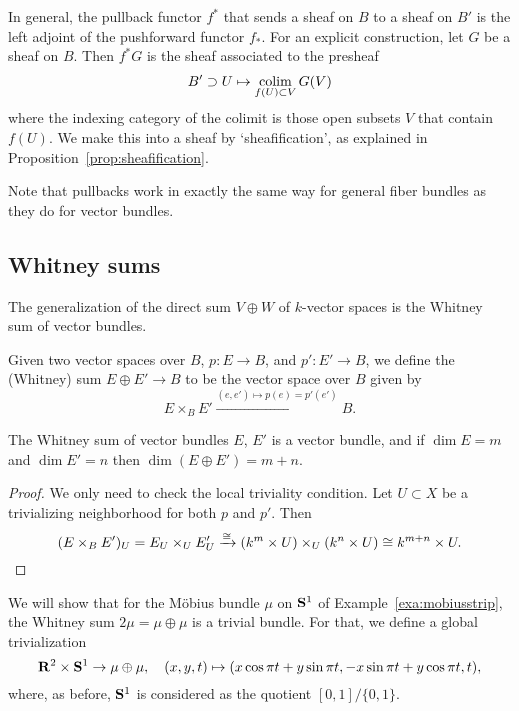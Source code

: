 \documentclass[a4paper,openany]{scrbook}
\begin{document}
In general, the pullback functor $f^*$ that sends a sheaf on $B$ to a sheaf on $B'$ is the left adjoint of the pushforward functor $f_*$. For an explicit construction, let $G$ be a sheaf on $B$. Then $f^*G$ is the sheaf associated to the presheaf
\begin{align*}
B' \supset U \mapsto \colim_{f(U) \subset V} G(V)
\end{align*}
where the indexing category of the colimit is those open subsets $V$ that contain $f(U)$. We make this into a sheaf by `sheafification', as explained in Proposition~\ref{prop:sheafification}.

Note that pullbacks work in exactly the same way for general fiber bundles as they do for vector bundles.

\subsection{Whitney sums} \label{ssec:whitneysums}

The generalization of the direct sum $V \oplus W$ of $k$-vector spaces is the Whitney sum of vector bundles.

\begin{defn}
Given two vector spaces over $B$, $p\colon E \to B$, and $p'\colon E' \to B$, we define the (Whitney) sum $E \oplus E' \to B$ to be the vector space over $B$ given by 
\[
E \times_B E' \xrightarrow{(e,e') \mapsto p(e) = p'(e')} B.
\]
\end{defn}

\begin{lemma}
The Whitney sum of vector bundles $E$, $E'$ is a vector bundle, and if $\dim E = m$ and $\dim E' = n$ then $\dim(E\oplus E') = m+n$.
\end{lemma}

\begin{proof}
We only need to check the local triviality condition. Let $U \subset X$ be a trivializing neighborhood for both $p$ and $p'$. Then
\[
(E \times_B E')_U = E_U \times_U E'_U \xrightarrow{\cong} (k^m \times U ) \times_U (k^n \times U ) \cong k^{m+n} \times U. \qedhere
\]
\end{proof}

\begin{example}
We will show that for the Möbius bundle $\mu$ on $\S^1$ of Example~\ref{exa:mobiusstrip}, the Whitney sum $2\mu = \mu \oplus \mu$ is a trivial bundle. For that, we define a global trivialization
\[
\R^2 \times \S^1 \to \mu \oplus \mu, \quad (x,y,t) \mapsto (x \cos \pi t + y \sin \pi t,-x \sin \pi t + y \cos \pi t,t),
\]
where, as before, $\S^1$ is considered as the quotient $[0,1]/\{0,1\}$.
\end{example}
\end{document}
